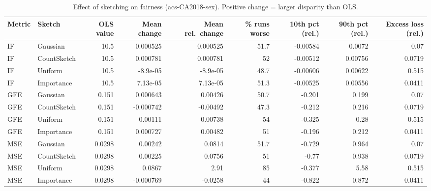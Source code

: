 \begin{table}[t]
\centering
\small
\begin{tabular}{llrrrrrrr}
\toprule
Metric & Sketch & OLS value & Mean change & Mean rel.\ change & \% runs worse & 10th pct (rel.) & 90th pct (rel.) & Excess loss (rel.) \\
\midrule
IF & Gaussian & 10.5 & 0.000525 & 0.000525 & 51.7 & -0.00584 & 0.0072 & 0.07 \\
IF & CountSketch & 10.5 & 0.000781 & 0.000781 & 52 & -0.00512 & 0.00756 & 0.0719 \\
IF & Uniform & 10.5 & -8.9e-05 & -8.9e-05 & 48.7 & -0.00606 & 0.00622 & 0.515 \\
IF & Importance & 10.5 & 7.13e-05 & 7.13e-05 & 51.3 & -0.00525 & 0.00556 & 0.0411 \\
\midrule
GFE & Gaussian & 0.151 & 0.000643 & 0.00426 & 50.7 & -0.201 & 0.199 & 0.07 \\
GFE & CountSketch & 0.151 & -0.000742 & -0.00492 & 47.3 & -0.212 & 0.216 & 0.0719 \\
GFE & Uniform & 0.151 & 0.00111 & 0.00738 & 54 & -0.325 & 0.28 & 0.515 \\
GFE & Importance & 0.151 & 0.000727 & 0.00482 & 51 & -0.196 & 0.212 & 0.0411 \\
\midrule
MSE & Gaussian & 0.0298 & 0.00242 & 0.0814 & 51.7 & -0.729 & 0.964 & 0.07 \\
MSE & CountSketch & 0.0298 & 0.00225 & 0.0756 & 51 & -0.77 & 0.938 & 0.0719 \\
MSE & Uniform & 0.0298 & 0.0867 & 2.91 & 85 & -0.377 & 5.58 & 0.515 \\
MSE & Importance & 0.0298 & -0.000769 & -0.0258 & 44 & -0.822 & 0.872 & 0.0411 \\
\bottomrule
\end{tabular}
\caption{Effect of sketching on fairness (acs-CA2018-sex). Positive change = larger disparity than OLS.}
\label{tab:harm_acs-CA2018-sex}
\end{table}